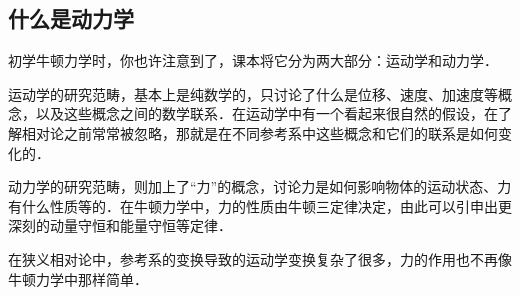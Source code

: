 




\subsection{什么是动力学}
初学牛顿力学时，你也许注意到了，课本将它分为两大部分：运动学和动力学．

运动学的研究范畴，基本上是纯数学的，只讨论了什么是位移、速度、加速度等概念，以及这些概念之间的数学联系．在运动学中有一个看起来很自然的假设，在了解相对论之前常常被忽略，那就是在不同参考系中这些概念和它们的联系是如何变化的．

动力学的研究范畴，则加上了“力”的概念，讨论力是如何影响物体的运动状态、力有什么性质等的．在牛顿力学中，力的性质由牛顿三定律决定，由此可以引申出更深刻的动量守恒和能量守恒等定律．

在狭义相对论中，参考系的变换导致的运动学变换复杂了很多，力的作用也不再像牛顿力学中那样简单．

